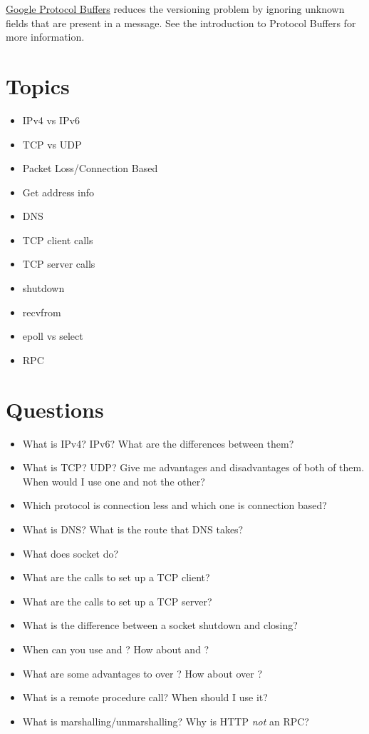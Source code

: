 \href{https://developers.google.com/protocol-buffers/docs/overview}{Google Protocol Buffers} reduces the versioning problem by ignoring unknown fields that are present in a message.
See the introduction to Protocol Buffers for more information.

\section{Topics}

\begin{itemize}
\tightlist
\item
  IPv4 vs IPv6
\item
  TCP vs UDP
\item
  Packet Loss/Connection Based
\item
  Get address info
\item
  DNS
\item
  TCP client calls
\item
  TCP server calls
\item
  shutdown
\item
  recvfrom
\item
  epoll vs select
\item
  RPC
\end{itemize}

\section{Questions}

\begin{itemize}
\tightlist
\item
  What is IPv4? IPv6? What are the differences between them?
\item
  What is TCP? UDP? Give me advantages and disadvantages of both of them.
  When would I use one and not the other?
\item
  Which protocol is connection less and which one is connection based?
\item
  What is DNS? What is the route that DNS takes?
\item
  What does socket do?
\item
  What are the calls to set up a TCP client?
\item
  What are the calls to set up a TCP server?
\item
  What is the difference between a socket shutdown and closing?
\item
  When can you use  and ? How about  and ?
\item
  What are some advantages to  over ? How about  over ?
\item
  What is a remote procedure call? When should I use it?
\item
  What is marshalling/unmarshalling? Why is HTTP \emph{not} an RPC?
\end{itemize}



